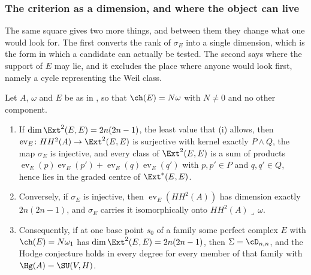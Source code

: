 \subsubsection*{The criterion as a dimension, and where the object can live}

The same square gives two more things, and between them they change what one
would look for. The first converts the rank of $\sigma_{E}$ into a single
dimension, which is the form in which a candidate can actually be tested. The
second says where the support of $E$ may lie, and it excludes the place where
anyone would look first, namely a cycle representing the Weil class.

\begin{theorem}\label{thm:p2numerical}
Let $A$, $\omega$ and $E$ be as in , so that
$\ch(E)=N\omega$ with $N\ne0$ and no other component.
\begin{enumerate}[label=\textup{(\roman*)},leftmargin=2.6em,itemsep=2pt]
\item If $\dim\Ext^{2}(E,E)=2n(2n-1)$, the least value that
  (i) allows, then $\operatorname{ev}_{E}\colon
  HH^{2}(A)\to\Ext^{2}(E,E)$ is surjective with kernel exactly $P\wedge Q$,
  the map $\sigma_{E}$ is injective, and every class of $\Ext^{2}(E,E)$ is a
  sum of products $\operatorname{ev}_{E}(p)\operatorname{ev}_{E}(p')
  +\operatorname{ev}_{E}(q)\operatorname{ev}_{E}(q')$ with $p,p'\in P$ and
  $q,q'\in Q$, hence lies in the graded centre of $\Ext^{*}(E,E)$.
\item Conversely, if $\sigma_{E}$ is injective, then
  $\operatorname{ev}_{E}(HH^{2}(A))$ has dimension exactly $2n(2n-1)$, and
  $\sigma_{E}$ carries it isomorphically onto $HH^{2}(A)\lrcorner\,\omega$.
\item Consequently, if at one base point $s_{0}$ of a family some perfect
  complex $E$ with $\ch(E)=N\omega_{1}$ has $\dim\Ext^{2}(E,E)=2n(2n-1)$,
  then $\Sigma=\cD_{n,n}$, and the Hodge conjecture holds in every degree for
  every member of that family with $\Hg(A)=\SU(V,H)$.
\end{enumerate}
\end{theorem}

